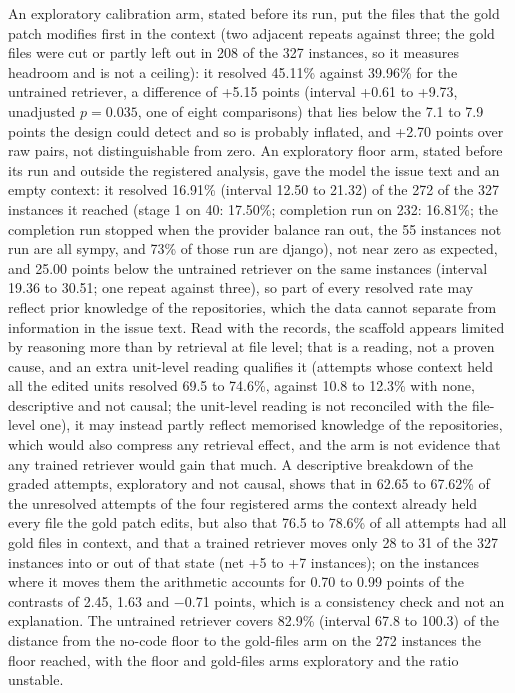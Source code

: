 \documentclass[10pt,twocolumn]{article}
\begin{document}
An exploratory calibration arm, stated before its run, put the files that the gold patch modifies first in the context (two adjacent repeats against three; the gold files were cut or partly left out in 208 of the 327 instances, so it measures headroom and is not a ceiling): it resolved 45.11\% against 39.96\% for the untrained retriever, a difference of +5.15 points (interval +0.61 to +9.73, unadjusted $p=0.035$, one of eight comparisons) that lies below the 7.1 to 7.9 points the design could detect and so is probably inflated, and +2.70 points over raw pairs, not distinguishable from zero. %
An exploratory floor arm, stated before its run and outside the registered analysis, gave the model the issue text and an empty context: it resolved 16.91\% (interval 12.50 to 21.32) of the 272 of the 327 instances it reached (stage 1 on 40: 17.50\%; completion run on 232: 16.81\%; the completion run stopped when the provider balance ran out, the 55 instances not run are all sympy, and 73\% of those run are django), not near zero as expected, and 25.00 points below the untrained retriever on the same instances (interval 19.36 to 30.51; one repeat against three), so part of every resolved rate may reflect prior knowledge of the repositories, which the data cannot separate from information in the issue text. %
Read with the records, the scaffold appears limited by reasoning more than by retrieval at file level; that is a reading, not a proven cause, and an extra unit-level reading qualifies it (attempts whose context held all the edited units resolved 69.5 to 74.6\%, against 10.8 to 12.3\% with none, descriptive and not causal; %
the unit-level reading is not reconciled with the file-level one), it may instead partly reflect memorised knowledge of the repositories, which would also compress any retrieval effect, and the arm is not evidence that any trained retriever would gain that much.
A descriptive breakdown of the graded attempts, exploratory and not causal, shows that in 62.65 to 67.62\% of the unresolved attempts of the four registered arms the context already held every file the gold patch edits, but also that 76.5 to 78.6\% of all attempts had all gold files in context, and that a trained retriever moves only 28 to 31 of the 327 instances into or out of that state (net +5 to +7 instances); on the instances where it moves them the arithmetic accounts for 0.70 to 0.99 points of the contrasts of 2.45, 1.63 and $-$0.71 points, which is a consistency check and not an explanation. The untrained retriever covers 82.9\% (interval 67.8 to 100.3) of the distance from the no-code floor to the gold-files arm on the 272 instances the floor reached, with the floor and gold-files arms exploratory and the ratio unstable. %
\end{document}
